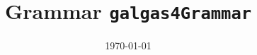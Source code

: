 \documentclass[landscape]{book}
\begin{document}
\title{\Huge{Grammar \texttt{galgas4Grammar}}}
\date \today 

\maketitle


\end{document}
